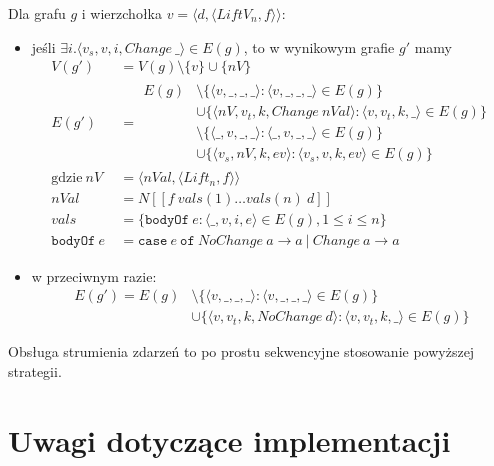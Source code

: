 \documentclass[11pt,leqno]{article}
\begin{document}
Dla grafu $g$ i wierzchołka $v = \langle d, \langle LiftV_n,f \rangle \rangle$:
\begin{itemize}
\item jeśli $ \exists i . \langle v_s , v, i, Change \: \_ \rangle \in E(g) $, to w wynikowym grafie $g'$ mamy
\begin {align*}
V(g') &= V(g) \setminus \{ v \} \cup \{ nV \} \\
E(g') &= \begin{aligned} E(g) &\setminus \{ \langle v, \_, \_, \_ \rangle : \langle v, \_, \_, \_ \rangle \in E(g) \} \\ 
&\cup \{ \langle nV, v_t, k, Change\: nVal \rangle : \langle v, v_t , k, \_ \rangle \in E(g) \} \\
&\setminus \{ \langle \_, v, \_, \_ \rangle : \langle \_, v, \_, \_ \rangle \in E(g) \} \\
&\cup \{ \langle v_s, nV, k, ev \rangle : \langle v_s, v, k, ev \rangle \in E(g) \} \end{aligned} \\
\text{gdzie} \:
nV &= \langle nVal , \langle Lift_n,f \rangle \rangle \\
nVal &= N [\![f \: vals(1) \ldots vals(n) \: d]\!] \\
vals &= \{ \texttt{bodyOf} \: e : \langle \_ , v, i, e \rangle \in E(g), 1 \leq i \leq n \} \\
\texttt{bodyOf} \: e \: &= \texttt{case} \: e \: \texttt{of} \: NoChange \: a \rightarrow a \: | \: Change \: a \rightarrow a
\end{align*}
\item w przeciwnym razie:
\begin{align*}
E(g') = E(g) &\setminus \{ \langle v, \_, \_, \_ \rangle : \langle v, \_ , \_, \_ \rangle \in E(g) \} \\ 
&\cup \{ \langle v, v_t, k, NoChange\: d \rangle : \langle v, v_t , k, \_ \rangle \in E(g) \}
\end{align*}
\end{itemize}

Obsługa strumienia zdarzeń to po prostu sekwencyjne stosowanie powyższej strategii.

\section{Uwagi dotyczące implementacji}
\end{document}
